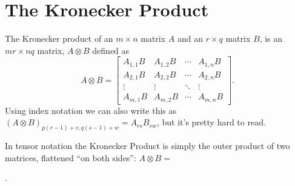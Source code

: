 \section{The Kronecker Product}
The Kronecker product of an $m\times n$ matrix $A$ and an $r \times q$ matrix $B$, is an $mr \times nq$ matrix, $A \otimes B$ defined as
\[
   \renewcommand*{\arraystretch}{1.3}
   A \otimes B = \begin{bmatrix}
      A_{1,1} B & A_{1,2} B & \cdots & A_{1,n} B \\
      A_{2,1} B & A_{2,2} B & \cdots & A_{2,n} B \\
      \vdots & \vdots & \ddots & \vdots \\
      A_{m,1} B & A_{m,2} B & \cdots & A_{m,n} B
   \end{bmatrix}
   .
\]
Using index notation we can also write this as
$(A\otimes B)_{p(r-1)+v, q(s-1)+w} = A_{rs} B_{vw}$, but it's pretty hard to read.

In tensor notation the Kronecker Product is simply the outer product of two matrices, flattened ``on both sides'':
$A\otimes B=$
.

